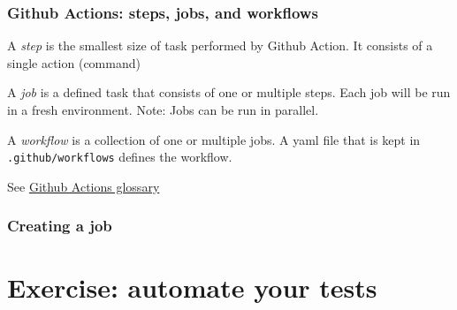 \documentclass[10pt]{beamer}
\begin{document}
  \begin{frame} \frametitle{Github Actions: steps, jobs, and workflows}

    A \textit{step} is the smallest size of task performed by Github Action. It consists
    of a single action (command)

    \vspace{0.25cm}

    A \textit{job} is a defined task that consists of one or multiple steps. Each job
    will be run in a fresh environment. Note: Jobs can be run in parallel.

    \vspace{0.25cm}

    A \textit{workflow} is a collection of one or multiple jobs. A yaml file that is
    kept in \texttt{.github/workflows} defines the workflow.

    \vspace{0.25cm}

    See \href{https://help.github.com/en/actions/automating-your-workflow-with-github-actions/core-concepts-for-github-actions}{Github Actions glossary}


  \end{frame}

  \begin{frame} \frametitle{Creating a job}
  \end{frame}

\section{Exercise: automate your tests}
\end{document}
